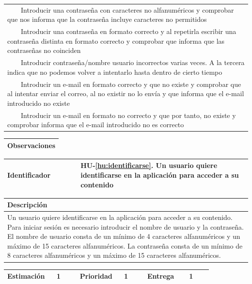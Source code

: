 \documentclass[11pt]{article}
\newcommand{\tabitem}{~~\llap{\textbullet}~~}
\begin{document}
\begin{longtable}{p{1.028\linewidth}}
  \tabitem Introducir una contraseña con caracteres no alfanuméricos y comprobar que nos informa que la contraseña incluye caracteres no permitidos\\
  \tabitem Introducir una contraseña en formato correcto y al repetirla escribir una contraseña distinta en formato correcto y comprobar que informa que las contraseñas no coinciden\\
  \tabitem Introducir contraseña/nombre usuario incorrectos varias veces. A la tercera indica que no podemos volver a intentarlo hasta dentro de cierto tiempo\\
  \tabitem Introducir un e-mail en formato correcto y que no existe y comprobar que al intentar enviar el correo, al no existir no lo envía y que informa que el e-mail introducido no existe\\
  \tabitem Introducir un e-mail en formato no correcto y que por tanto, no existe y comprobar informa que el e-mail introducido no es correcto\\

\end{longtable}
\begin{longtable}{p{1.028\linewidth}}
  \textbf{Observaciones}\\
  \midrule
  \bottomrule
  \bottomrule
\end{longtable}
\bigskip


  \centering
  \begin{longtable}{p{0.3\linewidth}|p{0.7\linewidth}}
    \toprule
    \toprule
    \textbf{Identificador} & \textbf{HU-\ref{hu:identificarse}}. Un usuario quiere identificarse en la aplicación para acceder a su contenido\\
    
    \bottomrule
  \end{longtable}

  \begin{longtable}{p{1.028\linewidth}}
    \textbf{Descripción}\\
    \midrule
    Un usuario quiere identificarse en la aplicación para acceder a su contenido. Para iniciar sesión es necesario introducir el nombre de usuario y la contraseña. El nombre de usuario consta de un mínimo de 4 caracteres alfanuméricos y un máximo de 15 caracteres alfanuméricos. La contraseña consta de un mínimo de 8 caracteres alfanuméricos y un máximo de 15 caracteres alfanuméricos.
  \end{longtable}
  \begin{longtable}{p{0.18\linewidth}|p{0.1\linewidth}|p{0.18\linewidth}|p{0.1\linewidth}|p{0.18\linewidth}|p{0.1\linewidth}}
    \toprule
    \textbf{Estimación} & 1 & \textbf{Prioridad} & 1 & \textbf{Entrega} & 1 \\
    \bottomrule
  \end{longtable}
\end{document}

